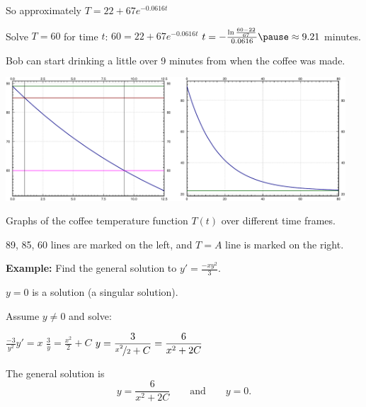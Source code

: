 \documentclass[10pt,aspectratio=169]{beamer}
\begin{document}
\begin{frame}
So approximately \quad $T = 22 + 67 e^{-0.0616t}$

\medskip
\pause

Solve $T=60$ for time $t$:
\quad
$60 = 22 + 67 e^{-0.0616t}$
\pause
\wthus
$t = - \frac{\ln \frac{60-22}{67}}{0.0616} \pause \approx 9.21$ minutes.

\medskip
\pause

Bob can start drinking a little over 9 minutes from when the coffee was
made.

\begin{center}
\includegraphics[width=5in]{../figures/coffeefig-1-2}
\end{center}

Graphs of the coffee temperature function $T(t)$ over different time frames.

89, 85, 60 lines are marked on the left, and $T=A$ line is marked on the
right.

\end{frame}

\begin{frame}

\textbf{Example:}
Find the general solution to $y' = \frac{-xy^2}{3}$.

\medskip
\pause

$y=0$ is a solution (a singular solution).

\medskip
\pause

Assume $y \not= 0$ and solve:

\medskip
\pause

\quad
$\displaystyle
\frac{-3}{y^2} y'  = x$
\pause
\wthus
$\displaystyle
\frac{3}{y} = \frac{x^2}{2} + C$
\pause
\wthus
$\displaystyle
y = \frac{3}{\nicefrac{x^2}{2} + C}
= \frac{6}{x^2 + 2C}
$

\medskip
\pause

The general solution is
\[
y = \frac{6}{x^2 + 2C} \qquad \text{and} \qquad y=0 .
\]

\end{frame}
\end{document}
